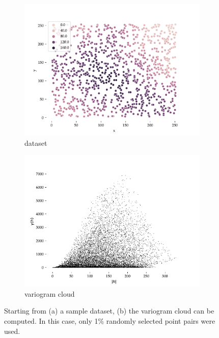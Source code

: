 \begin{figure}[htbp]
\begin{subfigure}{0.5\linewidth}
\centering
\includegraphics[width=\linewidth]{figs/data}
\caption{dataset}
\end{subfigure}%
\begin{subfigure}{0.5\linewidth}
\centering
\includegraphics[width=\linewidth]{figs/variogram_cloud}
\caption{variogram cloud}
\end{subfigure}%
\caption{Starting from (a) a sample dataset, (b) the variogram cloud can be computed.
In this case, only 1\% randomly selected point pairs were used.}%
\label{fig:variogram_cloud}
\end{figure}

